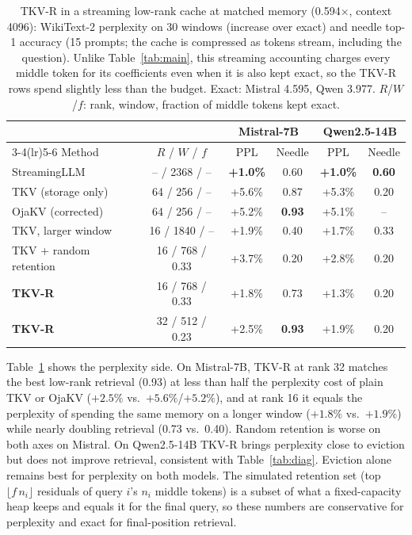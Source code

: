 \documentclass{article}
\begin{document}
\begin{table}[t]
\centering
\caption{TKV-R in a streaming low-rank cache at matched memory (0.594$\times$,
context 4096): WikiText-2 perplexity on 30 windows (increase over exact) and
needle top-1 accuracy (15 prompts; the cache is compressed as tokens stream,
including the question). Unlike Table~\ref{tab:main}, this streaming accounting
charges every middle token for its coefficients even when it is also kept
exact, so the TKV-R rows spend slightly less than the budget.
Exact: Mistral 4.595, Qwen 3.977. $R$/$W$/$f$: rank,
window, fraction of middle tokens kept exact.}
\label{tab:tkvr}
\small
\begin{tabular}{lccccc}
\toprule
& & \multicolumn{2}{c}{Mistral-7B} & \multicolumn{2}{c}{Qwen2.5-14B} \\
\cmidrule(lr){3-4}\cmidrule(lr){5-6}
Method & $R$ / $W$ / $f$ & PPL & Needle & PPL & Needle \\
\midrule
StreamingLLM            & -- / 2368 / --  & \textbf{+1.0\%} & 0.60 & \textbf{+1.0\%} & \textbf{0.60} \\
TKV (storage only)      & 64 / 256 / --   & +5.6\% & 0.87 & +5.3\% & 0.20 \\
OjaKV (corrected)       & 64 / 256 / --   & +5.2\% & \textbf{0.93} & +5.1\% & -- \\
TKV, larger window      & 16 / 1840 / --  & +1.9\% & 0.40 & +1.7\% & 0.33 \\
TKV + random retention  & 16 / 768 / 0.33 & +3.7\% & 0.20 & +2.8\% & 0.20 \\
\textbf{TKV-R}          & 16 / 768 / 0.33 & +1.8\% & 0.73 & +1.3\% & 0.20 \\
\textbf{TKV-R}          & 32 / 512 / 0.23 & +2.5\% & \textbf{0.93} & +1.9\% & 0.20 \\
\bottomrule
\end{tabular}
\end{table}

Table~\ref{tab:tkvr} shows the perplexity side. On Mistral-7B, TKV-R at
rank 32 matches the best low-rank retrieval (0.93) at less than half the
perplexity cost of plain TKV or OjaKV ($+2.5\%$ vs.\ $+5.6\%$/$+5.2\%$), and at
rank 16 it equals the perplexity of spending the same memory on a longer
window ($+1.8\%$ vs.\ $+1.9\%$) while nearly doubling retrieval (0.73 vs.\
0.40). Random retention is worse on both axes on Mistral. On Qwen2.5-14B TKV-R brings
perplexity close to eviction but does not improve retrieval, consistent with
Table~\ref{tab:diag}. Eviction alone remains best for perplexity on both
models. The simulated retention set (top $\lfloor f\,n_i\rfloor$ residuals of
query $i$'s $n_i$ middle tokens) is a subset of what a fixed-capacity heap
keeps and equals it for the final query, so these numbers are conservative
for perplexity and exact for final-position retrieval.
\end{document}

